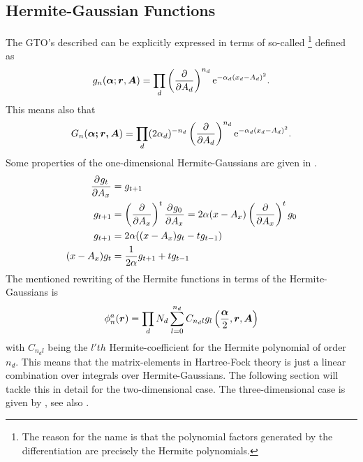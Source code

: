 \subsection{Hermite-Gaussian Functions\label{sec:hermiteGaussFunc}}
    The GTO's described can be explicitly expressed in terms of so-called
    \footnote{The reason for the name is that
    the polynomial factors generated by the differentiation are precisely the
    Hermite polynomials.} defined as
        \begin{equation}
            g_n(\boldsymbol{{\alpha}};\boldsymbol{{r}},\boldsymbol{{A}}) = \prod_d
            \left(\frac{\mathrm{\partial}}{\mathrm{\partial} A_d}\right)^{n_d} \mathrm{e}^{-\alpha_d(x_d-A_d)^2}.
        \end{equation}
    This means also that
        \begin{equation}
            G_n(\boldsymbol{{\alpha;\boldsymbol{{r}},\boldsymbol{{A}}}}) = \prod_d
            (2\alpha_d)^{-n_d}\left(\frac{\mathrm{\partial}}{\mathrm{\partial} A_d}\right)^{n_d} \mathrm{e}^{-\alpha_d(x_d-A_d)^2}.
        \end{equation}
    Some properties of the one-dimensional Hermite-Gaussians are given in
    .
        \begin{equation}
            \begin{aligned}
                \prd{A_x}[g_t] &= g_{t+1} \\
                g_{t+1} &= \prdp{A_x}{t}\prd{A_x}[g_0] =
                2\alpha(x-A_x)\prdp{A_x}{t}g_0 \\
                g_{t+1} &= 2\alpha((x-A_x)g_t - tg_{t-1}) \\
                (x-A_x)g_t &= \frac{1}{2\alpha}g_{t+1} + tg_{t-1}
            \end{aligned}
            \label{eq:hermiteGaussProp}
        \end{equation}
    The mentioned rewriting of the Hermite functions in terms of the
    Hermite-Gaussians is
        \begin{equation}
            \phi^a_n(\boldsymbol{{r}}) = \prod_d N_d \sum\limits^{n_d}_{l=0} C_{n_dl}
            g_l\left(\frac{\boldsymbol{{\alpha}}}{2},\boldsymbol{{r}},\boldsymbol{{A}}\right)
        \end{equation}
    with $C_{n_dl}$ being the $l'th$ Hermite-coefficient for the Hermite
    polynomial of order $n_d$. This means that the matrix-elements in
    Hartree-Fock theory is just a linear combination over integrals over
    Hermite-Gaussians. The following section will tackle this in detail for the
    two-dimensional case. The three-dimensional case is given by
    \cite{HelgakerTaylorGauss}, see also \cite{HelgakerGauss}.

